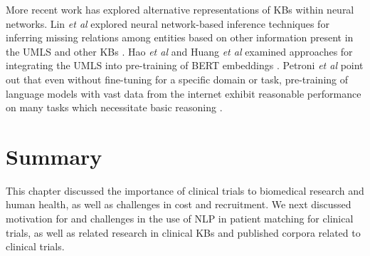 \documentclass[../main.tex]{subfiles}
\begin{document}
More recent work has explored alternative representations of KBs within neural networks. Lin \textit{et al} explored neural network-based inference techniques for inferring missing relations among entities based on other information present in the UMLS and other KBs \cite{lin2018multi}. Hao \textit{et al} and Huang \textit{et al} examined approaches for integrating the UMLS into pre-training of BERT \cite{devlin2018bert} embeddings \cite{hao2020enhancing, huang2020biomedical}. Petroni \textit{et al} point out that even without fine-tuning for a specific domain or task, pre-training of language models with vast data from the internet exhibit reasonable performance on many tasks which necessitate basic reasoning \cite{petroni2019language}.

\section{Summary}

This chapter discussed the importance of clinical trials to biomedical research and human health, as well as challenges in cost and recruitment. We next discussed motivation for and challenges in the use of NLP in patient matching for clinical trials, as well as related research in clinical KBs and published corpora related to clinical trials.
\end{document}
